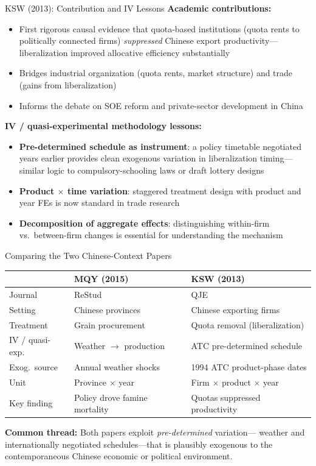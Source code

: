 \documentclass{beamer}
\begin{document}
\begin{frame}{KSW (2013): Contribution and IV Lessons}
\textbf{Academic contributions:}
\begin{itemize}
  \item First rigorous causal evidence that quota-based institutions
        (quota rents to politically connected firms) \emph{suppressed}
        Chinese export productivity---liberalization improved allocative
        efficiency substantially
  \item Bridges industrial organization (quota rents, market structure)
        and trade (gains from liberalization)
  \item Informs the debate on SOE reform and private-sector development
        in China
\end{itemize}

\medskip
\textbf{IV / quasi-experimental methodology lessons:}
\begin{itemize}
  \item \textbf{Pre-determined schedule as instrument}: a policy timetable
        negotiated years earlier provides clean exogenous variation in
        liberalization timing---similar logic to compulsory-schooling laws
        or draft lottery designs
  \item \textbf{Product $\times$ time variation}: staggered treatment design
        with product and year FEs is now standard in trade research
  \item \textbf{Decomposition of aggregate effects}: distinguishing
        within-firm vs.\ between-firm changes is essential for
        understanding the mechanism
\end{itemize}
\end{frame}

\begin{frame}{Comparing the Two Chinese-Context Papers}
\begin{center}
\small
\begin{tabular}{lll}
\toprule
 & \textbf{MQY (2015)} & \textbf{KSW (2013)} \\
\midrule
Journal & ReStud & QJE \\
Setting & Chinese provinces & Chinese exporting firms \\
Treatment & Grain procurement & Quota removal (liberalization) \\
IV / quasi-exp. & Weather $\to$ production & ATC pre-determined schedule \\
Exog.\ source & Annual weather shocks & 1994 ATC product-phase dates \\
Unit & Province $\times$ year & Firm $\times$ product $\times$ year \\
Key finding & Policy drove famine mortality & Quotas suppressed productivity \\
\bottomrule
\end{tabular}
\end{center}

\medskip
\textbf{Common thread:} Both papers exploit \emph{pre-determined} variation---
weather and internationally negotiated schedules---that is plausibly exogenous
to the contemporaneous Chinese economic or political environment.
\end{frame}
\end{document}
